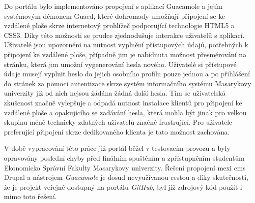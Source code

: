 Do portálu bylo implementováno propojení s aplikací Guacamole a jejím systémovým démonem Guacd, které dohromady umožňují připojení se ke vzdálené ploše skrze internetový prohlížeč podporující technologie HTML5 a CSS3. Díky této možnosti se prudce zjednodušuje interakce uživatelů s aplikací. Uživatelé jsou upozorněni na nutnost vyplnění přístupových údajů, potřebných k připojení ke vzdálené ploše, případně jim je nabídnuta možnost přesměrování na stránku, která jim umožní vygenerování hesla nového. Uživatelé si přístupové údaje musejí vyplnit heslo do jejich osobního profilu pouze jednou a po přihlášení do stránek za pomoci autentizace skrze systém informačního systému Masarykovy univerzity již od nich nejsou žádána žádná další hesla. Tím se uživatelská zkušenost značně vylepšuje a odpadá nutnost instalace klientů pro připojení ke vzdálené ploše a opakujícího se zadávání hesla, která mohla být jinak pro velkou skupinu méně technicky zdatných uživatelů značně frustrující. Pro uživatele preferující připojení skrze dedikovaného klienta je tato možnost zachována.

V době vypracování této práce již portál běžel v testovacím provozu a byly opravovány poslední chyby před finálním spuštěním a zpřístupněním studentům Ekonomicko Správní Fakulty Masarykovy univerzity. Řešení propojení mexi \gls{cms} Drupal a nástrojem \emph{Guacamole} je dosud nevyužívanou cestou a díky skutečnosti, že je projekt veřejně dostupný na portálu \emph{GitHub}, byl již zdrojový kód použit i mimo toto řešení.

